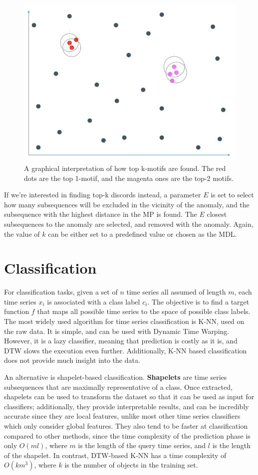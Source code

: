 \begin{figure}[ht]
    \centering
    \includegraphics[width=0.5\linewidth]{img/topk_motifs.png}
    \caption{A graphical interpretation of how top k-motifs are found. The red dots are the top 1-motif, and the magenta ones are the top-2 motifs.}
    \label{fig:top-k-motifs}
\end{figure}

If we're interested in finding top-k discords instead, a parameter $E$ is set to select how many subsequences will be excluded in the vicinity of the anomaly, and the subsequence with the highest distance in the MP is found. The $E$ closest subsequences to the anomaly are selected, and removed with the anomaly. Again, the value of $k$ can be either set to a predefined value or chosen as the MDL.

\section{Classification}

For classification tasks, given a set of $n$ time series all assumed of length $m$, each time series $x_i$ is associated with a class label $c_i$. The objective is to find a target function $f$ that maps all possible time series to the space of possible class labels. The most widely used algorithm for time series classification is K-NN, used on the raw data. It is simple, and can be used with Dynamic Time Warping. However, it is a lazy classifier, meaning that prediction is costly as it is, and DTW slows the execution even further. Additionally, K-NN based classification does not provide much insight into the data.

An alternative is shapelet-based classification. \textbf{Shapelets} are time series subsequences that are maximally representative of a class. Once extracted, shapelets can be used to transform the dataset so that it can be used as input for classifiers; additionally, they provide interpretable results, and can be incredibly accurate since they are local features, unlike most other time series classifiers which only consider global features. They also tend to be faster at classification compared to other methods, since the time complexity of the prediction phase is only $O(ml)$, where $m$ is the length of the query time series, and $l$ is the length of the shapelet. In contrast, DTW-based K-NN has a time complexity of $O(km^3)$, where $k$ is the number of objects in the training set.

